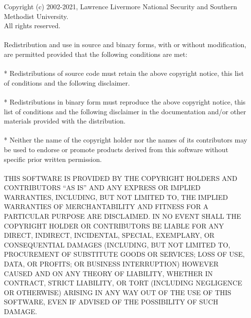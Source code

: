 Copyright (c) 2002-2021, Lawrence Livermore National Security and Southern
Methodist University.\\
All rights reserved.
\\
\\
Redistribution and use in source and binary forms, with or without
modification, are permitted provided that the following conditions are met:
\\
\\
* Redistributions of source code must retain the above copyright notice, this
  list of conditions and the following disclaimer.
\\
\\
* Redistributions in binary form must reproduce the above copyright notice,
  this list of conditions and the following disclaimer in the documentation
  and/or other materials provided with the distribution.
\\
\\
* Neither the name of the copyright holder nor the names of its
  contributors may be used to endorse or promote products derived from
  this software without specific prior written permission.
\\
\\
THIS SOFTWARE IS PROVIDED BY THE COPYRIGHT HOLDERS AND CONTRIBUTORS ``AS IS''
AND ANY EXPRESS OR IMPLIED WARRANTIES, INCLUDING, BUT NOT LIMITED TO, THE
IMPLIED WARRANTIES OF MERCHANTABILITY AND FITNESS FOR A PARTICULAR PURPOSE ARE
DISCLAIMED. IN NO EVENT SHALL THE COPYRIGHT HOLDER OR CONTRIBUTORS BE LIABLE
FOR ANY DIRECT, INDIRECT, INCIDENTAL, SPECIAL, EXEMPLARY, OR CONSEQUENTIAL
DAMAGES (INCLUDING, BUT NOT LIMITED TO, PROCUREMENT OF SUBSTITUTE GOODS OR
SERVICES; LOSS OF USE, DATA, OR PROFITS; OR BUSINESS INTERRUPTION) HOWEVER
CAUSED AND ON ANY THEORY OF LIABILITY, WHETHER IN CONTRACT, STRICT LIABILITY,
OR TORT (INCLUDING NEGLIGENCE OR OTHERWISE) ARISING IN ANY WAY OUT OF THE USE
OF THIS SOFTWARE, EVEN IF ADVISED OF THE POSSIBILITY OF SUCH DAMAGE.

